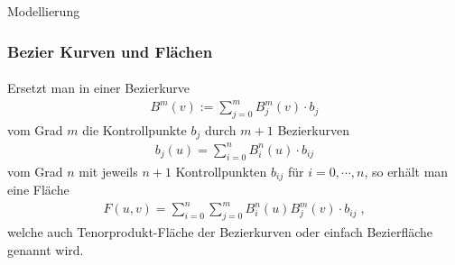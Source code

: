 \documentclass{beamer}
\begin{document}









\begin{frame}{Modellierung}
\frametitle{Bezier Kurven und Flächen}
\framesubtitle{}

Ersetzt man in einer Bezierkurve 
\begin{align*}
B^m(v) := \sum_{j = 0}^{m} B_j^m(v) \cdot  b_j
\end{align*}
vom Grad $m$ die Kontrollpunkte $b_j$ durch $m+1$ Bezierkurven
\begin{align*}
b_j (u)= \sum_{i = 0}^{n} B_i^n(u) \cdot  b_{ij}
\end{align*}
 vom Grad $n$ mit jeweils $n+1$ Kontrollpunkten $ b_{ij}$ für $i = 0, \cdots , n$, so erhält man eine Fläche
\begin{align*}
F(u,v) =  \sum_{i = 0}^{n}  \sum_{j = 0}^{m} B_i^n(u) B_j^m(v) \cdot  b_{ij} \; ,
\end{align*}
welche auch Tenorprodukt-Fläche der Bezierkurven  oder einfach Bezierfläche genannt wird.


\end{frame}
\end{document}
